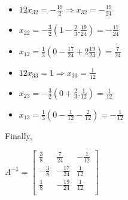 \begin{exercise}{6}
\begin{itemize}
\item $12x_{32} = -\frac{19}{2} \Rightarrow x_{32} = -\frac{19}{24}$
\item $x_{22} = -\frac{3}{2}(1-\frac{2}{3}.\frac{19}{24}) = -\frac{17}{24}$
\item $x_{12} = \frac{1}{3}(0-\frac{17}{24}+2\frac{19}{24}) = \frac{7}{24}$
\end{itemize}

\begin{itemize}
\item $12x_{33} = 1 \Rightarrow x_{33} = \frac{1}{12}$
\item $x_{23} = -\frac{3}{2}(0+\frac{2}{3}.\frac{1}{12}) = \frac{1}{12}$
\item $x_{13} = \frac{1}{3}(0-\frac{1}{12}-\frac{2}{12}) = -\frac{1}{12}$
\end{itemize}

Finally,
\begin{center}
$A^{-1} = \begin{bmatrix}
\frac{3}{8}&\frac{7}{24}&-\frac{1}{12}\\ 
-\frac{3}{8}&-\frac{17}{24}&\frac{1}{12}\\ 
\frac{1}{8}&-\frac{19}{24}&\frac{1}{12}\\ 
\end{bmatrix}
$
\end{center}
\end{exercise}
